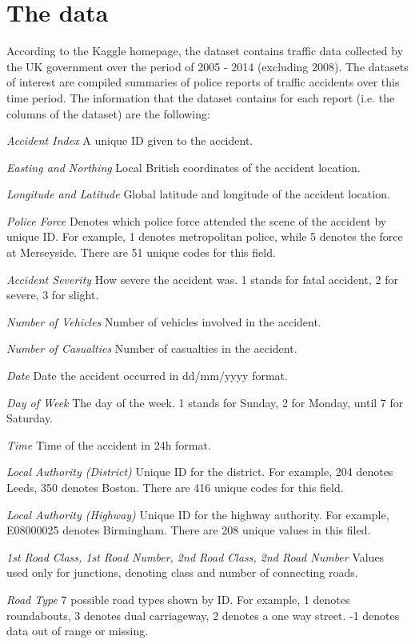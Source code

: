 \documentclass[a4paper, 12pt]{article}
\begin{document}
\section{The data}
According to the Kaggle homepage, the dataset contains traffic data collected by the UK government over the period of 2005 - 2014 (excluding 2008). The datasets of interest are compiled summaries of police reports of traffic accidents over this time period. The information that the dataset contains for each report (i.e. the columns of the dataset) are the following:
\begin{description}
\item{\emph{Accident Index}} A unique ID given to the accident.
\item{\emph{Easting and Northing}} Local British coordinates of the accident location.
\item{\emph{Longitude and Latitude}} Global latitude and longitude of the accident location.
\item{\emph{Police Force}} Denotes which police force attended the scene of the accident by unique ID. For example, 1 denotes metropolitan police, while 5 denotes the force at Merseyside. There are 51 unique codes for this field.
\item{\emph{Accident Severity}} How severe the accident was. 1 stands for fatal accident, 2 for severe, 3 for slight.
\item{\emph{Number of Vehicles}} Number of vehicles involved in the accident.
\item{\emph{Number of Casualties}} Number of casualties in the accident.
\item{\emph{Date}} Date the accident occurred in dd/mm/yyyy format.
\item{\emph{Day of Week}} The day of the week. 1 stands for Sunday, 2 for Monday, until 7 for Saturday.
\item{\emph{Time}} Time of the accident in 24h format.
\item{\emph{Local Authority (District)}} Unique ID for the district. For example, 204 denotes Leeds, 350 denotes Boston. There are 416 unique codes for this field.
\item{\emph{Local Authority (Highway)}} Unique ID for the highway authority. For example, E08000025 denotes Birmingham. There are 208 unique values in this filed.
\item{\emph{1st Road Class, 1st Road Number, 2nd Road Class, 2nd Road Number}} Values used only for junctions, denoting class and number of connecting roads.
\item{\emph{Road Type}} 7 possible road types shown by ID. For example, 1 denotes roundabouts, 3 denotes dual carriageway, 2 denotes a one way street. -1 denotes data out of range or missing.

\end{description}
\end{document}
